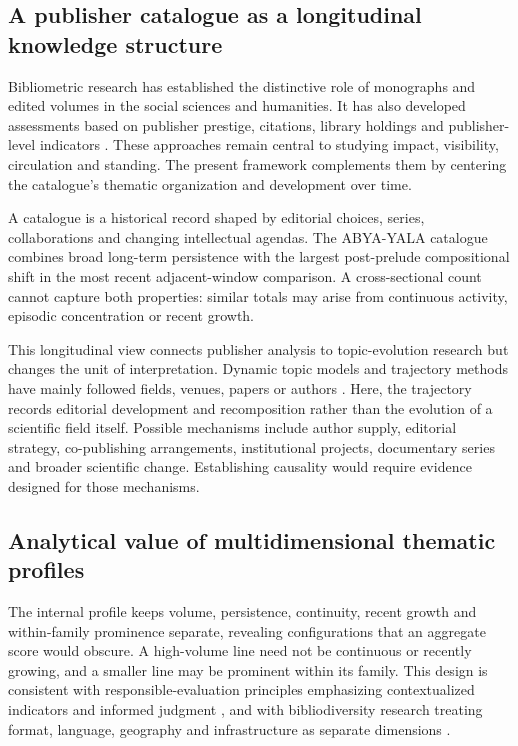 \documentclass[futureinternet,article,submit,moreauthors]{Definitions/mdpi}
\newcommand{\ABYA}{ABYA-YALA\xspace}
\begin{document}
\subsection{A publisher catalogue as a longitudinal knowledge structure}

Bibliometric research has established the distinctive role of monographs and edited volumes in the social sciences and humanities. It has also developed assessments based on publisher prestige, citations, library holdings and publisher-level indicators \citep{hicks2004four,nederhof2006bibliometric,williams2009monograph,kulczycki2018publication,engels2018books,gimenez2013publishers,white2009libcitations,kousha2011books,torres2014bookcitation,zuccala2015rank}. These approaches remain central to studying impact, visibility, circulation and standing. The present framework complements them by centering the catalogue's thematic organization and development over time.

A catalogue is a historical record shaped by editorial choices, series, collaborations and changing intellectual agendas. The \ABYA catalogue combines broad long-term persistence with the largest post-prelude compositional shift in the most recent adjacent-window comparison. A cross-sectional count cannot capture both properties: similar totals may arise from continuous activity, episodic concentration or recent growth.

This longitudinal view connects publisher analysis to topic-evolution research but changes the unit of interpretation. Dynamic topic models and trajectory methods have mainly followed fields, venues, papers or authors \citep{blei2006dynamic,schaefermeier2021topicspace,kim2022trajectories}. Here, the trajectory records editorial development and recomposition rather than the evolution of a scientific field itself. Possible mechanisms include author supply, editorial strategy, co-publishing arrangements, institutional projects, documentary series and broader scientific change. Establishing causality would require evidence designed for those mechanisms.

\subsection{Analytical value of multidimensional thematic profiles}

The internal profile keeps volume, persistence, continuity, recent growth and within-family prominence separate, revealing configurations that an aggregate score would obscure. A high-volume line need not be continuous or recently growing, and a smaller line may be prominent within its family. This design is consistent with responsible-evaluation principles emphasizing contextualized indicators and informed judgment \citep{hicks2015leiden}, and with bibliodiversity research treating format, language, geography and infrastructure as separate dimensions \citep{angioni2026bibliodiversity}.
\end{document}
